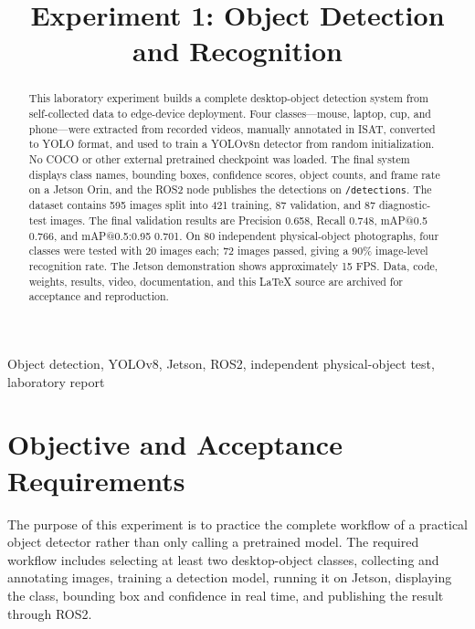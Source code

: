 \documentclass[11pt,conference,a4paper]{IEEEtran}
\newcommand{\code}[1]{\texttt{\footnotesize #1}}
\begin{document}
\title{Experiment 1: Object Detection and Recognition}
\author{
}
\maketitle
\thispagestyle{fancy}

\begin{abstract}
This laboratory experiment builds a complete desktop-object detection system from self-collected data to edge-device deployment. Four classes—mouse, laptop, cup, and phone—were extracted from recorded videos, manually annotated in ISAT, converted to YOLO format, and used to train a YOLOv8n detector from random initialization. No COCO or other external pretrained checkpoint was loaded. The final system displays class names, bounding boxes, confidence scores, object counts, and frame rate on a Jetson Orin, and the ROS2 node publishes the detections on \code{/detections}. The dataset contains 595 images split into 421 training, 87 validation, and 87 diagnostic-test images. The final validation results are Precision 0.658, Recall 0.748, mAP@0.5 0.766, and mAP@0.5:0.95 0.701. On 80 independent physical-object photographs, four classes were tested with 20 images each; 72 images passed, giving a 90\% image-level recognition rate. The Jetson demonstration shows approximately 15 FPS. Data, code, weights, results, video, documentation, and this LaTeX source are archived for acceptance and reproduction.
\end{abstract}

\begin{IEEEkeywords}
Object detection, YOLOv8, Jetson, ROS2, independent physical-object test, laboratory report
\end{IEEEkeywords}

\section{Objective and Acceptance Requirements}
The purpose of this experiment is to practice the complete workflow of a practical object detector rather than only calling a pretrained model. The required workflow includes selecting at least two desktop-object classes, collecting and annotating images, training a detection model, running it on Jetson, displaying the class, bounding box and confidence in real time, and publishing the result through ROS2.
\end{document}
